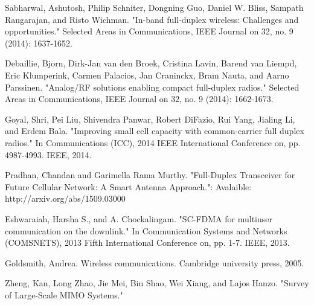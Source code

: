 \documentclass[conference]{IEEEtran}
\begin{document}
%
%
%
\begin{thebibliography}{1}

Sabharwal, Ashutosh, Philip Schniter, Dongning Guo, Daniel W. Bliss, Sampath Rangarajan, and Risto Wichman. "In-band full-duplex wireless: Challenges and opportunities." Selected Areas in Communications, IEEE Journal on 32, no. 9 (2014): 1637-1652.

Debaillie, Bjorn, Dirk-Jan van den Broek, Cristina Lavin, Barend van Liempd, Eric Klumperink, Carmen Palacios, Jan Craninckx, Bram Nauta, and Aarno Parssinen. "Analog/RF solutions enabling compact full-duplex radios." Selected Areas in Communications, IEEE Journal on 32, no. 9 (2014): 1662-1673.

Goyal, Shri, Pei Liu, Shivendra Panwar, Robert DiFazio, Rui Yang, Jialing Li, and Erdem Bala. "Improving small cell capacity with common-carrier full duplex radios." In Communications (ICC), 2014 IEEE International Conference on, pp. 4987-4993. IEEE, 2014.

Pradhan, Chandan and Garimella Rama Murthy. "Full-Duplex Transceiver for Future Cellular Network: A Smart Antenna Approach.": Avalaible: http://arxiv.org/abs/1509.03000

Eshwaraiah, Harsha S., and A. Chockalingam. "SC-FDMA for multiuser communication on the downlink." In Communication Systems and Networks (COMSNETS), 2013 Fifth International Conference on, pp. 1-7. IEEE, 2013.

   
Goldsmith, Andrea. Wireless communications. Cambridge university press, 2005.

Zheng, Kan, Long Zhao, Jie Mei, Bin Shao, Wei Xiang, and Lajos Hanzo. "Survey of Large-Scale MIMO Systems."






\end{thebibliography}
\end{document}
